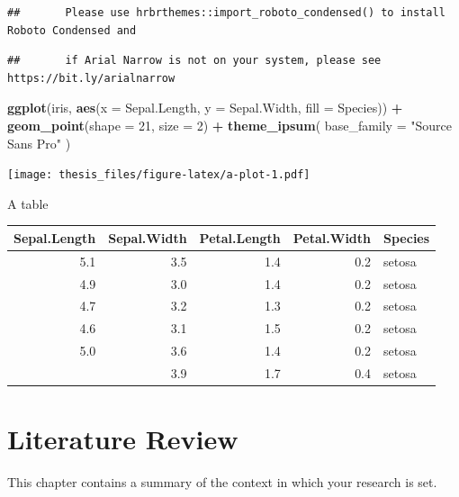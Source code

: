 \documentclass[oneside,12pt,a4paper,bibliography=totoc,numbers=noenddot,table]{scrreprt} %
\newenvironment{Shaded}{\begin{snugshade}}{\end{snugshade}}
\newcommand{\KeywordTok}[1]{\textcolor[rgb]{0.13,0.29,0.53}{\textbf{{#1}}}}
\newcommand{\DataTypeTok}[1]{\textcolor[rgb]{0.13,0.29,0.53}{{#1}}}
\newcommand{\DecValTok}[1]{\textcolor[rgb]{0.00,0.00,0.81}{{#1}}}
\newcommand{\StringTok}[1]{\textcolor[rgb]{0.31,0.60,0.02}{{#1}}}
\newcommand{\OperatorTok}[1]{\textcolor[rgb]{0.81,0.36,0.00}{\textbf{{#1}}}}
\newcommand{\NormalTok}[1]{{#1}}
\begin{document}
\begin{verbatim}
##       Please use hrbrthemes::import_roboto_condensed() to install Roboto Condensed and
\end{verbatim}

\begin{verbatim}
##       if Arial Narrow is not on your system, please see https://bit.ly/arialnarrow
\end{verbatim}

\begin{Shaded}
\begin{Highlighting}[]
\KeywordTok{ggplot}\NormalTok{(iris, }\KeywordTok{aes}\NormalTok{(}\DataTypeTok{x =}\NormalTok{ Sepal.Length, }\DataTypeTok{y =}\NormalTok{ Sepal.Width, }\DataTypeTok{fill =}\NormalTok{ Species)) }\OperatorTok{+}
\StringTok{  }\KeywordTok{geom\_point}\NormalTok{(}\DataTypeTok{shape =} \DecValTok{21}\NormalTok{, }\DataTypeTok{size =} \DecValTok{2}\NormalTok{) }\OperatorTok{+}
\StringTok{  }\KeywordTok{theme\_ipsum}\NormalTok{(}
    \DataTypeTok{base\_family =} \StringTok{"Source Sans Pro"}
\NormalTok{  )}
\end{Highlighting}
\end{Shaded}

\texttt{[image: thesis\_files/figure-latex/a-plot-1.pdf]}

A table

\begin{table}[H]
\centering
\begin{tabular}{rrrrl}
\toprule
Sepal.Length & Sepal.Width & Petal.Length & Petal.Width & Species\\
\midrule
5.1 & 3.5 & 1.4 & 0.2 & setosa\\
4.9 & 3.0 & 1.4 & 0.2 & setosa\\
4.7 & 3.2 & 1.3 & 0.2 & setosa\\
4.6 & 3.1 & 1.5 & 0.2 & setosa\\
5.0 & 3.6 & 1.4 & 0.2 & setosa\\
\addlinespace
5.4 & 3.9 & 1.7 & 0.4 & setosa\\
\bottomrule
\end{tabular}
\end{table}

\hypertarget{ch:litreview}{%
\chapter{Literature Review}\label{ch:litreview}}

This chapter contains a summary of the context in which your research is set.
\end{document}
